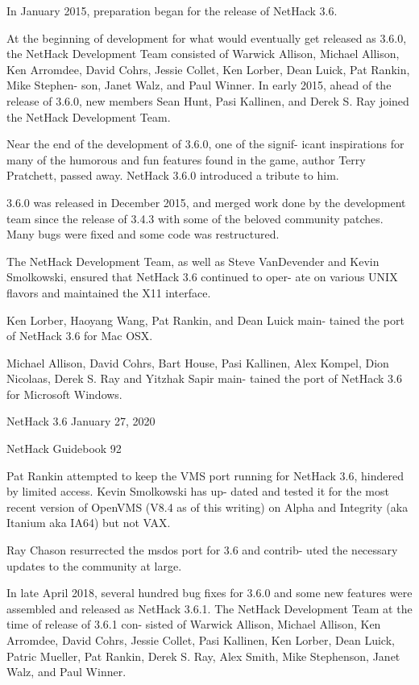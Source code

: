 \documentclass[11pt]{article}
\begin{document}
   In January 2015, preparation began for the release of
NetHack 3.6.

   At the beginning of development for what would eventually
get released as 3.6.0, the NetHack Development Team consisted of
Warwick Allison, Michael Allison, Ken Arromdee, David Cohrs,
Jessie Collet, Ken Lorber, Dean Luick, Pat Rankin, Mike Stephen-
son, Janet Walz, and Paul Winner. In early 2015, ahead of the
release of 3.6.0, new members Sean Hunt, Pasi Kallinen, and Derek
S. Ray joined the NetHack Development Team.

   Near the end of the development of 3.6.0, one of the signif-
icant inspirations for many of the humorous and fun features
found in the game, author Terry Pratchett, passed away. NetHack
3.6.0 introduced a tribute to him.

   3.6.0 was released in December 2015, and merged work done by
the development team since the release of 3.4.3 with some of the
beloved community patches. Many bugs were fixed and some code was
restructured.

   The NetHack Development Team, as well as Steve VanDevender
and Kevin Smolkowski, ensured that NetHack 3.6 continued to oper-
ate on various UNIX flavors and maintained the X11 interface.

   Ken Lorber, Haoyang Wang, Pat Rankin, and Dean Luick main-
tained the port of NetHack 3.6 for Mac OSX.

   Michael Allison, David Cohrs, Bart House, Pasi Kallinen,
Alex Kompel, Dion Nicolaas, Derek S. Ray and Yitzhak Sapir main-
tained the port of NetHack 3.6 for Microsoft Windows.




NetHack 3.6                   January 27, 2020





NetHack Guidebook                       92



   Pat Rankin attempted to keep the VMS port running for
NetHack 3.6, hindered by limited access. Kevin Smolkowski has up-
dated and tested it for the most recent version of OpenVMS (V8.4
as of this writing) on Alpha and Integrity (aka Itanium aka IA64)
but not VAX.

   Ray Chason resurrected the msdos port for 3.6 and contrib-
uted the necessary updates to the community at large.

   In late April 2018, several hundred bug fixes for 3.6.0 and
some new features were assembled and released as NetHack 3.6.1.
The NetHack Development Team at the time of release of 3.6.1 con-
sisted of Warwick Allison, Michael Allison, Ken Arromdee, David
Cohrs, Jessie Collet, Pasi Kallinen, Ken Lorber, Dean Luick,
Patric Mueller, Pat Rankin, Derek S. Ray, Alex Smith, Mike
Stephenson, Janet Walz, and Paul Winner.
\end{document}
